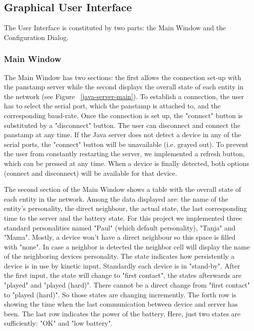 \subsection{Graphical User Interface}


The User Interface is constituted by two parts: the Main Window and the Configuration Dialog.

\subsubsection{Main Window}

The Main Window has two sections: the first allows the connection set-up with the panstamp server while the second displays the overall state of each entity in the network (see Figure ~\ref{java-server-main}). 
To establish a connection, the user has to select the serial port, which the panstamp is attached to, and the corresponding baud-rate. Once the connection is set up, the "connect" button is substituted by a "disconnect" button. The user can disconnect and connect the panstamp at any time. 
If the Java server does not detect a device in any of the serial ports, the "connect" button will be unavailable (i.e. grayed out). To prevent the user from constantly restarting the server, we implemented a refresh button, which can be pressed at any time. When a device is finally detected, both options (connect and disconnect) will be available for that device.

The second section of the Main Window shows a table with the overall state of each entity in the network.
Among the data displayed are: the name of the entity's personality, the direct neighbour, the actual state, the last corresponding time to the server and the battery state. 
For this project we implemented three standard personalities named "Paul" (which default personality), "Tanja" and "Mama".
Mostly, a device won't have a direct neighbour so this space is filled with "none". In case a neighbor is detected the neighbor cell will display the name of the neighboring devices personality. 
The state indicates how persistently a device is in use by kinetic input.
Standardly each device is in "stand-by". After the first input, the state will change to "first contact", the states afterwards are "played" and "played (hard)". There cannot be a direct change from "first contact" to "played (hard)". So those states are changing incremently.
The forth row is showing the time when the last communication between device and server has been.
The last row indicates the power of the battery. Here, just two states are sufficiently: "OK" and "low battery".

